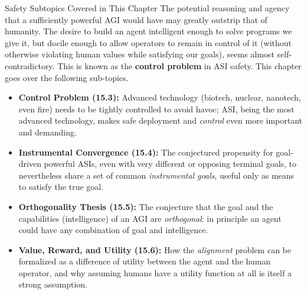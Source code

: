 \documentclass[aspectratio=169,10pt]{beamer}
\begin{document}
\begin{frame}[allowframebreaks]{Safety Subtopics Covered in This Chapter}
  The potential reasoning and agency that a sufficiently powerful AGI
  would have may greatly outstrip that of humanity. The desire to build an
  agent intelligent enough to solve programs we give it, but docile
  enough to allow operators to remain in control of it (without otherwise
  violating human values while satisfying our goals), seems almost
  self-contradictory. This is known as the \textbf{control problem} in
  ASI safety. This chapter goes over the following sub-topics.

  \begin{itemize}
    \item \textbf{Control Problem (15.3):} Advanced technology (biotech,
      nuclear, nanotech, even fire) needs to be tightly controlled to
      avoid havoc; ASI, being the most advanced technology, makes safe
      deployment and \emph{control} even more important and demanding.
    \item \textbf{Instrumental Convergence (15.4):} The conjectured
      propensity for goal-driven powerful ASIs, even with very different
      or opposing terminal goals, to nevertheless share a set of common
      \emph{instrumental goals}, useful only as means to satisfy the true
      goal.
    \item \textbf{Orthogonality Thesis (15.5):} The conjecture that the
      goal and the capabilities (intelligence) of an AGI are
      \emph{orthogonal}: in principle an agent could have any combination
      of goal and intelligence.
    \item \textbf{Value, Reward, and Utility (15.6):} How the
      \emph{alignment} problem can be formalized as a difference of
      utility between the agent and the human operator, and why assuming
      humans have a utility function at all is itself a strong assumption.
  \end{itemize}

  \framebreak


\end{frame}
\end{document}
